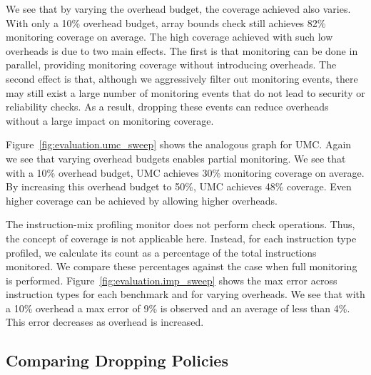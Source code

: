 We see that by varying the overhead budget, the coverage achieved also varies.
With only a 10\% overhead budget, array bounds check still
achieves 82\% monitoring coverage on average. The high coverage
achieved with such low overheads is due to two main effects.  The first is that
monitoring can be done in parallel, providing monitoring coverage without
introducing overheads. The second effect is that, although we aggressively
filter out monitoring events, there may still exist a large number of
monitoring events that do not lead to security or reliability checks. As a
result, dropping these events can reduce overheads without a large impact on
monitoring coverage.

Figure~\ref{fig:evaluation.umc_sweep} shows the analogous graph for UMC. Again
we see that varying overhead budgets enables partial monitoring. We see that
with a 10\% overhead budget, UMC achieves 30\% monitoring coverage on average.
By increasing this overhead budget to 50\%, UMC achieves 48\% coverage. Even
higher coverage can be achieved by allowing higher overheads.

The instruction-mix profiling monitor does not perform check operations. Thus,
the concept of coverage is not applicable here. Instead, for each instruction
type profiled, we calculate its count as a percentage of the total instructions
monitored. We compare these percentages against the case when full monitoring
is performed. Figure~\ref{fig:evaluation.imp_sweep} shows the max error across
instruction types for each benchmark and for varying overheads. We see that
with a 10\% overhead a max error of 9\% is observed and an average of less than
4\%. This error decreases as overhead is increased.

\subsection{Comparing Dropping Policies}

